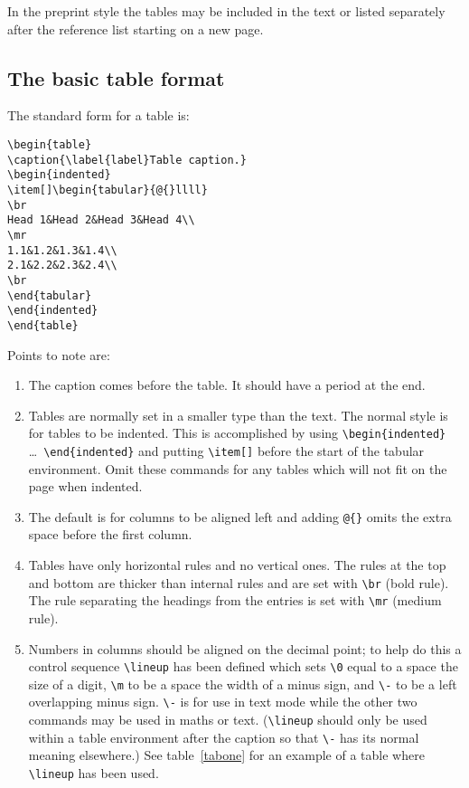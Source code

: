 \documentclass[12pt]{iopart}
\begin{document}
In the preprint style the tables may be included in the text 
or listed separately after the reference list 
starting on a new page. 

\subsection{The basic table format}
The standard form for a table is:
\small\begin{verbatim}
\begin{table}
\caption{\label{label}Table caption.}
\begin{indented}
\item[]\begin{tabular}{@{}llll}
\br
Head 1&Head 2&Head 3&Head 4\\
\mr
1.1&1.2&1.3&1.4\\
2.1&2.2&2.3&2.4\\
\br
\end{tabular}
\end{indented}
\end{table}
\end{verbatim}\normalsize

Points to note are:
\begin{enumerate}
\item The caption comes before the table. It should have a period at
the end.

\item Tables are normally set in a smaller type than the text.
The normal style is for tables to be indented. This is accomplished
by using \verb"\begin{indented}" \dots\ \verb"\end{indented}"
and putting \verb"\item[]" before the start of the tabular environment.
Omit these
commands for any tables which will not fit on the page when indented.

\item The default is for columns to be aligned left and 
adding \verb"@{}" omits the extra space before the first column.

\item Tables have only horizontal rules and no vertical ones. The rules at
the top and bottom are thicker than internal rules and are set with
\verb"\br" (bold rule). 
The rule separating the headings from the entries is set with
\verb"\mr" (medium rule).

\item Numbers in columns should be aligned on the decimal point;
to help do this a control sequence \verb"\lineup" has been defined 
which sets \verb"\0" equal to a space the size of a digit, \verb"\m"
to be a space the width of a minus sign, and \verb"\-" to be a left
overlapping minus sign. \verb"\-" is for use in text mode while the other
two commands may be used in maths or text.
(\verb"\lineup" should only be used within a table
environment after the caption so that \verb"\-" has its normal meaning
elsewhere.) See table~\ref{tabone} for an example of a table where
\verb"\lineup" has been used.
\end{enumerate}
\end{document}
